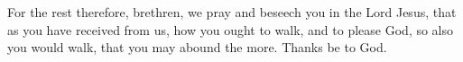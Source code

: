 For the rest therefore, brethren, we pray and beseech you in the Lord Jesus, that as you have received from us, how you ought to walk, and to please God, so also you would walk, that you may abound the more. \rubric{\Rbar} Thanks be to God.